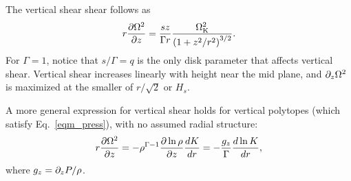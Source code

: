 The vertical shear shear follows as
\begin{align}
  r\frac{\partial\Omega^2}{\partial z} = \frac{sz}{\Gamma r}  \frac{\Omega_{\rm K}^2}{
    \left(1+z^2/r^2\right)^{3/2}} . \label{vertical_shear_ex} 
\end{align}
For $\Gamma = 1$, notice that $s/\Gamma = q$ is the only disk parameter that affects vertical shear.
Vertical shear increases linearly with height near the mid plane, and $\partial_z \Omega^2$ is maximized at
the smaller of $r/\sqrt{2}$ or $H_s$.

A more general expression for vertical shear holds for vertical polytopes 
(which satisfy Eq.\ \ref{eqm_press}), with no assumed radial structure:
\begin{align}
  r\frac{\partial\Omega^2}{\partial z} = - \rho^{\Gamma-1}\frac{\partial\ln\rho}{\partial
    z}\frac{dK}{dr} = - \frac{g_z}{\Gamma}\frac{d\ln K}{dr}, \label{vertical_shear}
\end{align}
where $g_z = \partial_z P/\rho$.




